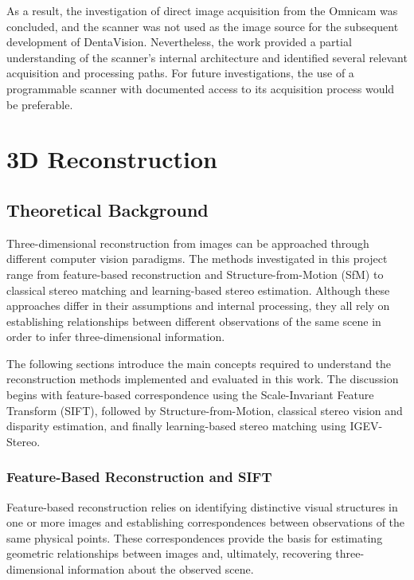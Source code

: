 As a result, the investigation of direct image acquisition from the Omnicam was concluded, and the scanner was not used as the image source for the subsequent development of DentaVision. Nevertheless, the work provided a partial understanding of the scanner's internal architecture and identified several relevant acquisition and processing paths. For future investigations, the use of a programmable scanner with documented access to its acquisition process would be preferable.


\section{3D Reconstruction}

\subsection{Theoretical Background}

Three-dimensional reconstruction from images can be approached through different computer vision paradigms. The methods investigated in this project range from feature-based reconstruction and Structure-from-Motion (SfM) to classical stereo matching and learning-based stereo estimation. Although these approaches differ in their assumptions and internal processing, they all rely on establishing relationships between different observations of the same scene in order to infer three-dimensional information.

The following sections introduce the main concepts required to understand the reconstruction methods implemented and evaluated in this work. The discussion begins with feature-based correspondence using the Scale-Invariant Feature Transform (SIFT), followed by Structure-from-Motion, classical stereo vision and disparity estimation, and finally learning-based stereo matching using IGEV-Stereo.

\subsubsection{Feature-Based Reconstruction and SIFT}

Feature-based reconstruction relies on identifying distinctive visual structures in one or more images and establishing correspondences between observations of the same physical points. These correspondences provide the basis for estimating geometric relationships between images and, ultimately, recovering three-dimensional information about the observed scene.

